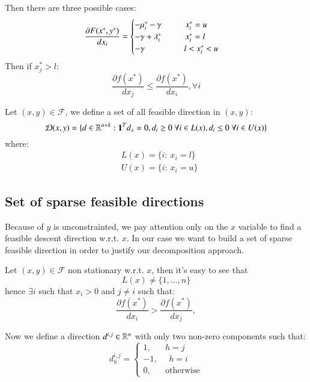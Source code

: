 Then there are three possible cases:
\begin{equation}
 \frac{\partial F(x^*,y^*)}{dx_i} = \begin{cases} -\mu_i^* -\gamma \hspace{1cm} x^*_i =u \\
 -\gamma+\lambda^*_i \hspace{1cm} x^*_i =l \\
 -\gamma \hspace{1.65cm} l<x^*_i <u 
\end{cases}
\end{equation}
Then if $x^*_j>l$:
\begin{equation}
 \frac{\partial f(x^*)}{dx_j} \le \frac{\partial f(x^*)}{dx_i}, \forall i
\end{equation}

Let $(x,y) \in \mathcal{F}$, we define a set of all feasible direction in $(x,y)$:
\begin{equation}
 \mathcal{D}(x,y)=\{ d \in \mathbb{R}^{n+k}: \mathbf{1}^Td_x=0, d_i\ge 0 \ \forall i \in L(x), d_i\le 0 \ \forall i \in U(x)\}
\end{equation}
where:
\begin{equation}
 \begin{aligned}
  &L(x)=\{ i: \ x_i=l\}\\
  &U(x)=\{ i: \ x_i=u\}
 \end{aligned}
\end{equation}



\subsection{Set of sparse feasible directions}
Because of $y$ is unconstrainted, we pay attention only on the $x$ variable to find a feasible descent direction w.r.t. $x$. 
In our case we want to build a set of sparse feasible direction in order to justify our decomposition approach.

Let $(x,y) \in \mathcal{F}$ non stationary w.r.t. $x$, then it's easy to see that
\begin{equation}
 L(x)\ne \{1,\ldots,n\}
\end{equation}
hence $\exists i$ such that $x_i>0$ and $j \ne i$ such that:
\begin{equation}
 \frac{\partial f(x^*)}{dx_i} > \frac{\partial f(x^*)}{dx_j}, 
\end{equation}

\hspace{-1.8em} Now we define a direction $d^{i,j} \in \mathbb{R}^n$ with only two non-zero components such that:
\begin{equation}\label{eq:direction}
d_h^{i,j}= 
\begin{cases}
1, \quad \text{    } h=j\\
-1, \text{    } \text{    } h=i\\
0, \quad \text{    } \text{otherwise}
\end{cases}
\end{equation}

